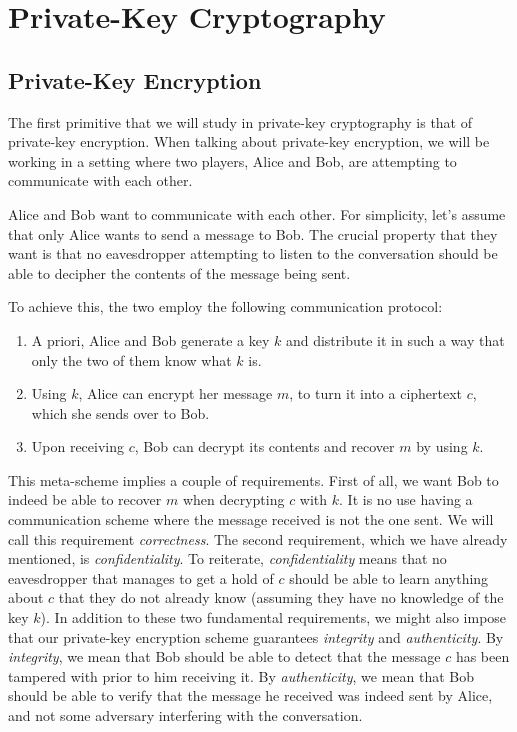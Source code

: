 \chapter{Private-Key Cryptography}
\newcommand{\gen}{\mathsf{Gen}}
\section{Private-Key Encryption}
The first primitive that we will study in private-key cryptography is that of private-key encryption.
When talking about private-key encryption, we will be working in a setting where two players, Alice and Bob, are attempting to communicate with each other.

Alice and Bob want to communicate with each other.
For simplicity, let's assume that only Alice wants to send a message to Bob.
The crucial property that they want is that no eavesdropper attempting to listen to the conversation should be able to decipher the contents of the message being sent.
\begin{comment}
\begin{center}
    \begin{tikzpicture}
        \draw;
    \end{tikzpicture}
\end{center}    
\end{comment}

To achieve this, the two employ the following communication protocol:
\begin{enumerate}
    \item A priori, Alice and Bob generate a key $k$ and distribute it in such a way that only the two of them know what $k$ is.
    \item Using $k$, Alice can encrypt her message $m$, to turn it into a ciphertext $c$, which she sends over to Bob. 
    \item Upon receiving $c$, Bob can decrypt its contents and recover $m$ by using $k$.
\end{enumerate}
This meta-scheme implies a couple of requirements.
First of all, we want Bob to indeed be able to recover $m$ when decrypting $c$ with $k$.
It is no use having a communication scheme where the message received is not the one sent. We will call this requirement \textit{correctness}.
The second requirement, which we have already mentioned, is \textit{confidentiality}.
To reiterate, \textit{confidentiality} means that no eavesdropper that manages to get a hold of $c$ should be able to learn anything about $c$ that they do not already know (assuming they have no knowledge of the key $k$).
In addition to these two fundamental requirements, we might also impose that our private-key encryption scheme guarantees \textit{integrity} and \textit{authenticity}.
By \textit{integrity}, we mean that Bob should be able to detect that the message $c$ has been tampered with prior to him receiving it.
By \textit{authenticity}, we mean that Bob should be able to verify that the message he received was indeed sent by Alice, and not some adversary interfering with the conversation.

